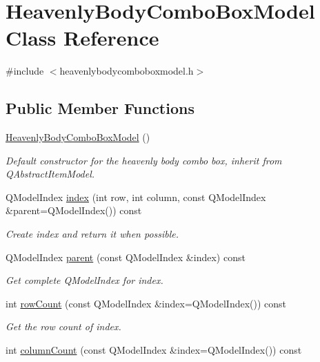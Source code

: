 \hypertarget{classHeavenlyBodyComboBoxModel}{
\section{\-Heavenly\-Body\-Combo\-Box\-Model \-Class \-Reference}
\label{dd/d88/classHeavenlyBodyComboBoxModel}
}


{\ttfamily \#include $<$heavenlybodycomboboxmodel.\-h$>$}

\subsection*{\-Public \-Member \-Functions}
\begin{DoxyCompactItemize}
\item 
\hyperlink{classHeavenlyBodyComboBoxModel_af1f95ee9f2c7f9bd134e5111e21528b4}{\-Heavenly\-Body\-Combo\-Box\-Model} ()
\begin{DoxyCompactList}\small\item\em \-Default constructor for the heavenly body combo box, inherit from \-Q\-Abstract\-Item\-Model. \end{DoxyCompactList}\item 
\-Q\-Model\-Index \hyperlink{classHeavenlyBodyComboBoxModel_aeb459de382f97296ffd4739a95bfd3eb}{index} (int row, int column, const \-Q\-Model\-Index \&parent=\-Q\-Model\-Index()) const 
\begin{DoxyCompactList}\small\item\em \-Create index and return it when possible. \end{DoxyCompactList}\item 
\-Q\-Model\-Index \hyperlink{classHeavenlyBodyComboBoxModel_a8dc114dec8426c6e6264302470dab392}{parent} (const \-Q\-Model\-Index \&index) const 
\begin{DoxyCompactList}\small\item\em \-Get complete \-Q\-Model\-Index for index. \end{DoxyCompactList}\item 
int \hyperlink{classHeavenlyBodyComboBoxModel_af9e833868b66e60566d27233529cc5ab}{row\-Count} (const \-Q\-Model\-Index \&index=\-Q\-Model\-Index()) const 
\begin{DoxyCompactList}\small\item\em \-Get the row count of index. \end{DoxyCompactList}\item 
int \hyperlink{classHeavenlyBodyComboBoxModel_a5cf2c26b6129647b144880b1472b4436}{column\-Count} (const \-Q\-Model\-Index \&index=\-Q\-Model\-Index()) const 

\end{DoxyCompactItemize}
